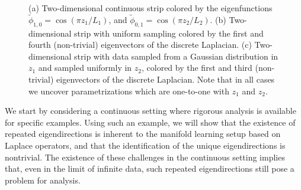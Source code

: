 \begin{figure}[t]
\begin{subfigure}{0.3\textwidth}
\caption{}
\label{subfig:strip_evecs_nonuniform}
\end{subfigure}
%
\caption{(a) Two-dimensional continuous strip colored by the eigenfunctions $\tilde{\phi}_{1, 0} = \cos \left( {\pi z_1}/{L_1} \right)$, and $\tilde{\phi}_{0, 1} = \cos \left( {\pi z_2}/{L_2} \right)$. (b) Two-dimensional strip with uniform sampling colored by the first and fourth (non-trivial) eigenvectors of the discrete Laplacian. (c) Two-dimensional strip with data sampled from a Gaussian distribution in $z_1$ and sampled uniformly in $z_2$, colored by the first and third (non-trivial) eigenvectors of the discrete Laplacian. Note that in all cases we uncover parametrizations which are one-to-one with $z_1$ and $z_2$.}
\end{figure}


We start by considering a continuous setting where rigorous analysis is available for specific examples.
%
Using such an example, we will show that the existence of repeated eigendirections is inherent to the manifold learning setup based on Laplace operators, and that the identification of the unique eigendirections is nontrivial.
%
The existence of these challenges in the continuous setting implies that, even in the limit of infinite data, such repeated eigendirections still pose a problem for analysis.


